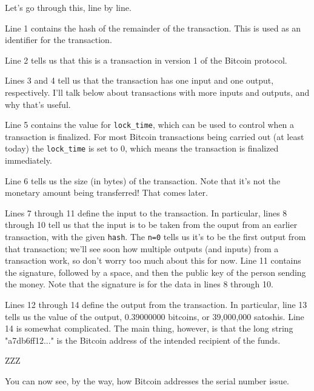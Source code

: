 \documentclass[12pt]{book}
\begin{document}
Let's go through this, line by line.

Line 1 contains the hash of the remainder of the transaction.  This is
used as an identifier for the transaction.

Line 2 tells us that this is a transaction in version 1 of the Bitcoin
protocol.

Lines 3 and 4 tell us that the transaction has one input and one
output, respectively.  I'll talk below about transactions with more
inputs and outputs, and why that's useful. 

Line 5 contains the value for \verb|lock_time|, which can be used to
control when a transaction is finalized.  For most Bitcoin
transactions being carried out (at least today) the \verb|lock_time|
is set to 0, which means the transaction is finalized immediately.

Line 6 tells us the size (in bytes) of the transaction.  Note that
it's not the monetary amount being transferred!  That comes later.

Lines 7 through 11 define the input to the transaction.  In
particular, lines 8 through 10 tell us that the input is to be taken
from the ouput from an earlier transaction, with the given
\verb|hash|.  The \verb|n=0| tells us it's to be the first output from
that transaction; we'll see soon how multiple outputs (and inputs)
from a transaction work, so don't worry too much about this for now.
Line 11 contains the signature, followed by a space, and then the
public key of the person sending the money.  Note that the signature
is for the data in lines 8 through 10. 

Lines 12 through 14 define the output from the transaction.  In
particular, line 13 tells us the value of the output, 0.39000000
bitcoins, or 39,000,000 satoshis.  Line 14 is somewhat complicated.
The main thing, however, is that the long string "a7db6ff12..." is the
Bitcoin address of the intended recipient of the funds.

ZZZ

You can now see, by the way, how Bitcoin addresses the serial number
issue.
\end{document}
